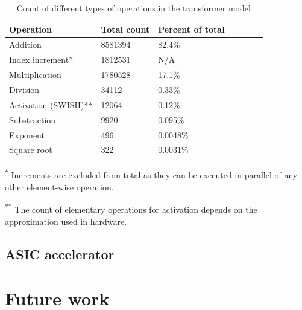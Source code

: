 \documentclass[12pt]{article}
\begin{document}
    \begin{table}[ht]
        \centering
        \renewcommand{\arraystretch}{1.2} %
        \setlength{\arrayrulewidth}{1.5pt} %
        \caption{Count of different types of operations in the transformer model}
        \begin{tabular}{@{} *7l @{}}
            \toprule
            Operation            & Total count & Percent of total &&&  \\\midrule
            Addition             & 8581394     & 82.4\%   \\
            Index increment*     & 1812531     & N/A      \\
            Multiplication       & 1780528     & 17.1\%   \\
            Division             & 34112       & 0.33\%   \\
            Activation (SWISH)** & 12064       & 0.12\%   \\
            Substraction         & 9920        & 0.095\%  \\
            Exponent             & 496         & 0.0048\% \\
            Square root          & 322         & 0.0031\% \\
            \hline
        \end{tabular}
        \begin{minipage}{\textwidth}
            \footnotesize
            \textsuperscript{*} Increments are excluded from total as they can be executed in parallel of any other element-wise operation.

            \textsuperscript{**} The count of elementary operations for activation depends on the approximation used in hardware.
        \end{minipage}
        \label{tab:num_ops}
    \end{table}

    \subsection{ASIC accelerator}

    \section{Future work}
\end{document}
